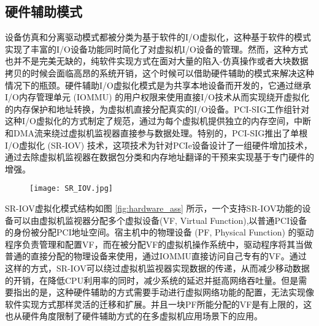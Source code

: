 \subsection{硬件辅助模式}
设备仿真和分离驱动模式都被分类为基于软件的I/O虚拟化，这种基于软件的模式实现了丰富的I/O设备功能同时简化了对虚拟机I/O设备的管理。然而，这种方式也并不是完美无缺的，纯软件实现方式在面对大量的陷入-仿真操作或者大块数据拷贝的时候会面临高昂的系统开销，这个时候可以借助硬件辅助的模式来解决这种情况下的瓶颈。硬件辅助I/O虚拟化模式是为共享本地设备而开发的，它通过继承I/O内存管理单元 (IOMMU) 的用户权限来使用直接I/O技术从而实现绕开虚拟化的内存保护和地址转换，为虚拟机直接分配真实的I/O设备。PCI-SIG工作组针对这种I/O虚拟化的方式制定了规范，通过为每个虚拟机提供独立的内存空间，中断和DMA流来绕过虚拟机监视器直接参与数据处理。特别的，PCI-SIG推出了单根I/O虚拟化 (SR-IOV) 技术，这项技术为针对PCIe设备设计了一组硬件增加技术，通过去除虚拟机监视器在数据包分类和内存地址翻译的干预来实现基于专门硬件的增强。
\begin{figure}[!htp]
	\centering
	\texttt{[image: SR\_IOV.jpg]}
\end{figure}
SR-IOV虚拟化模式结构如图 \ref{fig:hardware_ass} 所示，一个支持SR-IOV功能的设备可以由虚拟机监视器分配多个虚拟设备(VF, Virtual Function),以普通PCI设备的身份被分配PCI地址空间。宿主机中的物理设备 (PF, Physical Function) 的驱动程序负责管理和配置VF，而在被分配VF的虚拟机操作系统中，驱动程序将其当做普通的直接分配的物理设备来使用，通过IOMMU直接访问自己专有的VF。通过这样的方式，SR-IOV可以绕过虚拟机监视器实现数据的传递，从而减少移动数据的开销，在降低CPU利用率的同时，减少系统的延迟并挺高网络吞吐量。但是需要指出的是，这种硬件辅助的方式需要手动进行虚拟网络功能的配置，无法实现像软件实现方式那样灵活的迁移和扩展。并且一块PF所能分配的VF是有上限的，这也从硬件角度限制了硬件辅助方式的在多虚拟机应用场景下的应用。


